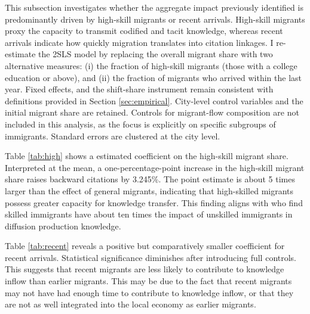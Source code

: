 \documentclass[12pt]{article}
\begin{document}
This subsection investigates whether the aggregate impact previously identified is predominantly driven by high-skill migrants or recent arrivals. High-skill migrants proxy the capacity to transmit codified and tacit knowledge, whereas recent arrivals indicate how quickly migration translates into citation linkages.
I re-estimate the 2SLS model by replacing the overall migrant share with two alternative measures: (i) the fraction of high-skill migrants (those with a college education or above), and (ii) the fraction of migrants who arrived within the last year.  Fixed effects, and the shift-share instrument remain consistent with definitions provided in Section \ref{sec:empirical}. City-level control variables and the initial migrant share are retained. Controls for migrant-flow composition are not included in this analysis, as the focus is explicitly on specific subgroups of immigrants. Standard errors are clustered at the city level.


Table \ref{tab:high} shows a estimated coefficient on the high-skill migrant share.
Interpreted at the mean, a one-percentage-point increase in the high-skill migrant share raises backward citations by 3.245\%. The point estimate is about 5 times larger than the effect of general migrants, indicating that high-skilled migrants possess greater capacity for knowledge transfer. This finding aligns with \cite{baharMigrationKnowledgeDiffusion2018} who find skilled immigrants have about ten times the impact of unskilled immigrants in diffusion production knowledge. 

Table \ref{tab:recent} reveals a positive but comparatively smaller coefficient for recent arrivals. Statistical significance diminishes after introducing full controls.
This suggests that recent migrants are less likely to contribute to knowledge inflow than earlier migrants. This may be due to the fact that recent migrants may not have had enough time to contribute to knowledge inflow, or that they are not as well integrated into the local economy as earlier migrants.
\end{document}
